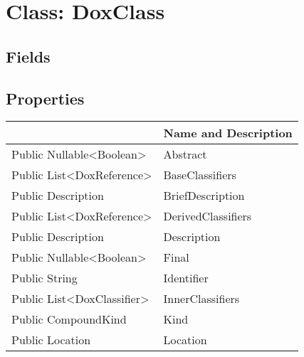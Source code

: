 \documentclass[11pt, oneside, a4paper]{book}
\begin{document}
\hypertarget{SoftwareEngineeringTools.{}Documentation.{}DoxClass}{}
\section{Class: DoxClass}

\subsection{Fields}

\subsection{Properties}
\begin{center}
\begin{tabular}{| p{3cm} | p{12cm} | }
\hline
\textbf{ } & \textbf{ Name and Description}\\
\hline
 Public  Nullable<Boolean> &  Abstract\hypertarget{SoftwareEngineeringTools.{}Documentation.{}DoxClass.{}Abstract}{}\\
\hline
 Public  List<DoxReference> &  BaseClassifiers\hypertarget{SoftwareEngineeringTools.{}Documentation.{}DoxClass.{}BaseClassifiers}{}\\
\hline
 Public  Description &  BriefDescription\hypertarget{SoftwareEngineeringTools.{}Documentation.{}DoxClass.{}BriefDescription}{}\\
\hline
 Public  List<DoxReference> &  DerivedClassifiers\hypertarget{SoftwareEngineeringTools.{}Documentation.{}DoxClass.{}DerivedClassifiers}{}\\
\hline
 Public  Description &  Description\hypertarget{SoftwareEngineeringTools.{}Documentation.{}DoxClass.{}Description}{}\\
\hline
 Public  Nullable<Boolean> &  Final\hypertarget{SoftwareEngineeringTools.{}Documentation.{}DoxClass.{}Final}{}\\
\hline
 Public  String &  Identifier\hypertarget{SoftwareEngineeringTools.{}Documentation.{}DoxClass.{}Identifier}{}\\
\hline
 Public  List<DoxClassifier> &  InnerClassifiers\hypertarget{SoftwareEngineeringTools.{}Documentation.{}DoxClass.{}InnerClassifiers}{}\\
\hline
 Public  CompoundKind &  Kind\hypertarget{SoftwareEngineeringTools.{}Documentation.{}DoxClass.{}Kind}{}\\
\hline
 Public  Location &  Location\hypertarget{SoftwareEngineeringTools.{}Documentation.{}DoxClass.{}Location}{}\\

\end{tabular}
\end{center}
\end{document}
